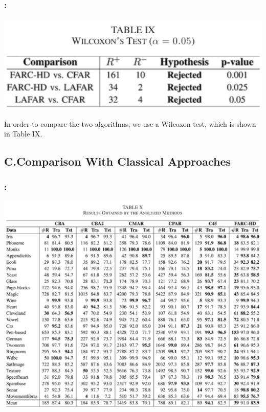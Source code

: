 \documentclass{beamer}
\begin{document}
\begin{CJK*}{UTF8}{bsmi}
\begin{frame}
	\frametitle{\insertsection : \insertsubsection}
	\begin{center}
		\includegraphics[width=1\textheight]{./17.png}
	\end{center}
	In order to compare the two algorithms, we use a Wilcoxon test, which is shown in Table IX.
\end{frame}


\subsection{C.Comparison With Classical Approaches}


\begin{frame}
	\frametitle{\insertsection : \insertsubsection}
	\begin{center}
		\includegraphics[height=.75\textheight]{./18.png}
	\end{center}
\end{frame}


\end{CJK*}
\end{document}
